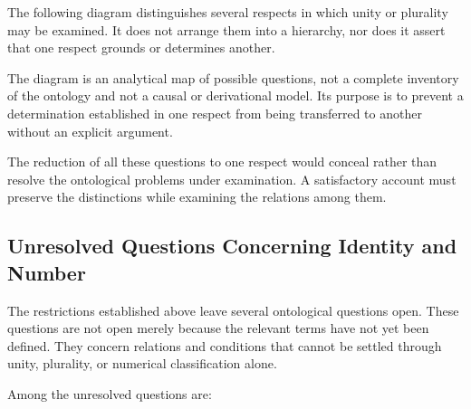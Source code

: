 The following diagram distinguishes several
respects in which unity or plurality may be
examined. It does not arrange them into a
hierarchy, nor does it assert that one respect
grounds or determines another.



The diagram is an analytical map of possible
questions, not a complete inventory of the
ontology and not a causal or derivational model.
Its purpose is to prevent a determination
established in one respect from being transferred
to another without an explicit argument.

The reduction of all these questions to one
respect would conceal rather than resolve the
ontological problems under examination. A
satisfactory account must preserve the distinctions
while examining the relations among them.

\subsection{Unresolved Questions Concerning Identity and Number}

The restrictions established above leave several
ontological questions open. These questions are
not open merely because the relevant terms have
not yet been defined. They concern relations and
conditions that cannot be settled through unity,
plurality, or numerical classification alone.

Among the unresolved questions are:

